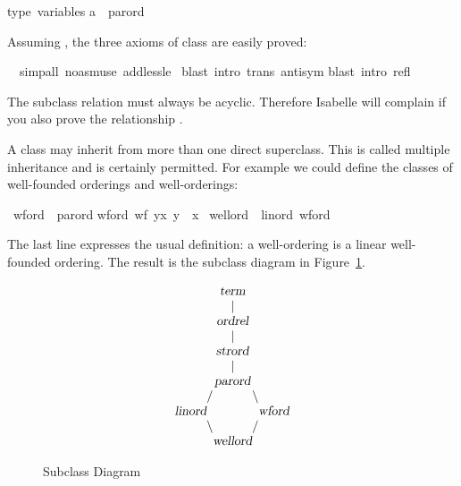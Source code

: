 \begin{isabellebody}
\begin{isamarkuptxt}
\begin{isabelle}
type\ variables{\isacharcolon}\isanewline
\isaindent{\ \ }{\isacharprime}a\ {\isacharcolon}{\isacharcolon}\ parord%
\end{isabelle}
Assuming , the three axioms of class 
are easily proved:%
\end{isamarkuptxt}%
\ \ simp{\isacharunderscore}all\ {\isacharparenleft}no{\isacharunderscore}asm{\isacharunderscore}use{\isacharparenright}\ add{\isacharcolon}less{\isacharunderscore}le{\isacharparenright}\isanewline
\ blast\ intro{\isacharcolon}\ trans\ antisym{\isacharparenright}\isanewline
{}blast\ intro{\isacharcolon}\ refl{\isacharparenright}\isanewline
{}%
\begin{isamarkuptext}%
The subclass relation must always be acyclic. Therefore Isabelle will
complain if you also prove the relationship .%
\end{isamarkuptext}%
%
%
\begin{isamarkuptext}%
A class may inherit from more than one direct superclass. This is called
multiple inheritance and is certainly permitted. For example we could define
the classes of well-founded orderings and well-orderings:%
\end{isamarkuptext}%
\ wford\ {\isacharless}\ parord\isanewline
wford{\isacharcolon}\ {\isachardoublequote}wf\ {\isacharbraceleft}{\isacharparenleft}y{\isacharcomma}x{\isacharparenright}{\isachardot}\ y\ {\isacharless}{\isacharless}\ x{\isacharbraceright}{\isachardoublequote}\isanewline
\isanewline
{}\ wellord\ {\isacharless}\ linord{\isacharcomma}\ wford%
\begin{isamarkuptext}%
\noindent
The last line expresses the usual definition: a well-ordering is a linear
well-founded ordering. The result is the subclass diagram in
Figure~\ref{fig:subclass}.

\begin{figure}[htbp]
\[
\begin{array}{r@ {}r@ {}c@ {}l@ {}l}
& & \isa{term}\\
& & |\\
& & \isa{ordrel}\\
& & |\\
& & \isa{strord}\\
& & |\\
& & \isa{parord} \\
& / & & \backslash \\
\isa{linord} & & & & \isa{wford} \\
& \backslash & & / \\
& & \isa{wellord}
\end{array}
\]
\caption{Subclass Diagram}
\label{fig:subclass}
\end{figure}


\end{isamarkuptext}
\end{isabellebody}
